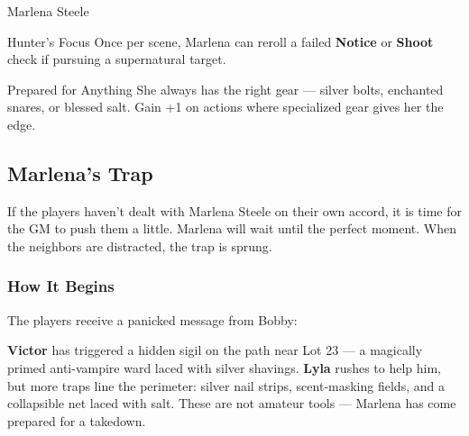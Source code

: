 \begin{multicols}{2}
\begin{NPC}[description={Hunter, Focused, Not Easily Fooled}]{Marlena Steele}
    \begin{TraitsBox}
        \item[Hunter’s Focus] Once per scene, Marlena can reroll a failed \textbf{Notice} or \textbf{Shoot} check if pursuing a supernatural target.
        \item[Prepared for Anything] She always has the right gear — silver bolts, enchanted snares, or blessed salt. Gain +1 on actions where specialized gear gives her the edge.
    \end{TraitsBox}

    \DamageBox[%
        totalfatigue=3,%
        totalmild=1,totalmoderate=1,totalsevere=0,%
    ]
\end{NPC}


\subsection{Marlena’s Trap}

If the players haven't dealt with Marlena Steele on their own accord, it is time for the GM to push them a little. Marlena will wait until the perfect moment. When the neighbors are distracted, the trap is sprung.

\subsubsection*{How It Begins}
The players receive a panicked message from Bobby:  
\begin{center}
\end{center}

\textbf{Victor} has triggered a hidden sigil on the path near Lot 23 — a magically primed anti-vampire ward laced with silver shavings.  
\textbf{Lyla} rushes to help him, but more traps line the perimeter: silver nail strips, scent-masking fields, and a collapsible net laced with salt. These are not amateur tools — Marlena has come prepared for a takedown.


\end{multicols}
